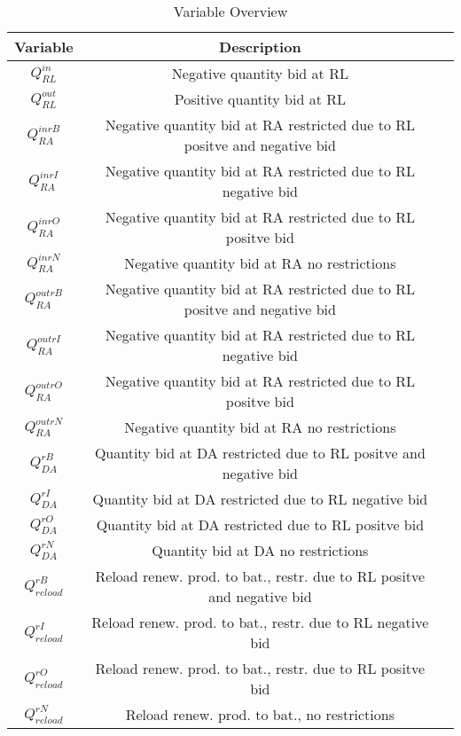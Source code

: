 \begin{table}[!h]
	\begin{tabular}{c|c|c}
		\textbf{Variable} & \textbf{Description}                                                      \\
		\hline
		$Q^{in}_{RL}$     & Negative quantity bid at RL                                               \\
		$Q^{out}_{RL}$    & Positive quantity bid at RL                                               \\
		$Q^{inrB}_{RA}$   & Negative quantity bid at RA restricted due to RL positve and negative bid \\
		$Q^{inrI}_{RA}$   & Negative quantity bid at RA restricted due to RL negative bid             \\
		$Q^{inrO}_{RA}$   & Negative quantity bid at RA restricted due to RL positve bid              \\
		$Q^{inrN}_{RA}$   & Negative quantity bid at RA no restrictions                               \\
		$Q^{outrB}_{RA}$  & Negative quantity bid at RA restricted due to RL positve and negative bid \\
		$Q^{outrI}_{RA}$  & Negative quantity bid at RA restricted due to RL negative bid             \\
		$Q^{outrO}_{RA}$  & Negative quantity bid at RA restricted due to RL positve bid              \\
		$Q^{outrN}_{RA}$  & Negative quantity bid at RA no restrictions                               \\
		$Q^{rB}_{DA}$     & Quantity bid at DA restricted due to RL positve and negative bid          \\
		$Q^{rI}_{DA}$     & Quantity bid at DA restricted due to RL negative bid                      \\
		$Q^{rO}_{DA}$     & Quantity bid at DA restricted due to RL positve bid                       \\
		$Q^{rN}_{DA}$     & Quantity bid at DA no restrictions                                        \\
		$Q^{rB}_{reload}$ & Reload renew. prod. to bat., restr. due to RL positve and negative bid    \\
		$Q^{rI}_{reload}$ & Reload renew. prod. to bat., restr. due to RL negative bid                \\
		$Q^{rO}_{reload}$ & Reload renew. prod. to bat., restr. due to RL positve bid                 \\
		$Q^{rN}_{reload}$ & Reload renew. prod. to bat., no restrictions                              \\
	\end{tabular}
	\caption{Variable Overview}
	\label{tab:Variable_Overview}
\end{table}

